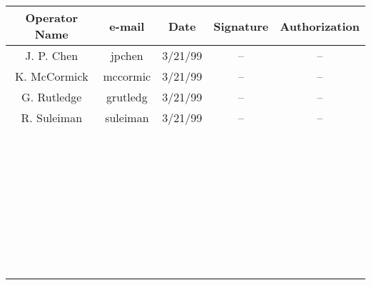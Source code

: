 \begin{center}
\begin{tabular}{|c|c|c|c|c|}
\hline 
Operator Name&e-mail&
 Date&
 Signature&
 Authorization\\
\hline 
J. P. Chen&jpchen&
 3/21/99&
 --&
 --\\
\hline 
K. McCormick&mccormic&
 3/21/99&
 --&
 --\\
\hline 
G. Rutledge&grutledg&
 3/21/99&
 --&
 --\\
\hline 
R. Suleiman&suleiman&
3/21/99&
--&
--\\
\hline 
&&
&
&
\\
\hline 
&&
&
&
\\
\hline 
&&
&
&
\\
\hline 
&&
&
&
\\
\hline 
&&
&
&
\\
\hline 
&&
&
&
\\
\hline 
&&
&
&
\\
\hline 
&&
&
&
\\
\hline 
&&
&
&
\\
\hline 
&&
&
&
\\
\hline 
&&
&
&
\\
\hline 
&&
&
&
\\
\hline 
&&
&
&
\\
\hline 
&&
&
&
\\
\hline 
&&
&
&
\\
\hline 
&&
&
&
\\
\hline 
&&
&
&
\\
\hline 
&&
&
&
\\
\hline 
&&
&
&
\\
\hline 
&&
&
&
\\
\hline 
&&
&
&
\\
\hline 
&&
&
&
\\
\hline 
&&
&
&
\\
\hline 
&&
&
&
\\
\hline 
&&
&
&
\\
\hline 
&&
&
&
\\
\hline 
&&
&
&
\\
\hline 
&&
&
&
\\
\hline 
&&
&
&
\\
\hline 
&&
&
&
\\
\hline 
&&
&
&
\\
\hline 
&&
&
&
\\
\hline 
&&
&
&
\\
\hline 
&&
&
&
\\
\hline 
&&
&
&
 \\
\hline 
\end{tabular}
\end{center}

